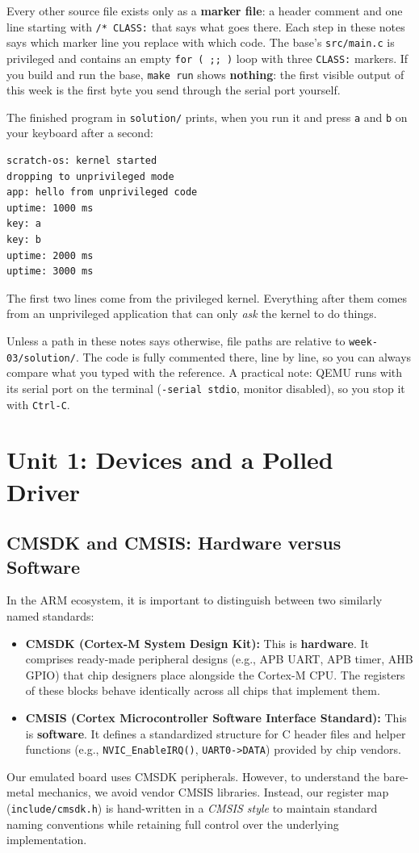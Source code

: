 Every other source file exists only as a \textbf{marker file}: a header comment and one line starting with \texttt{/* CLASS:} that says what goes there. Each step in these notes says which marker line you replace with which code. The base's \texttt{src/main.c} is privileged and contains an empty \texttt{for ( ;; )} loop with three \texttt{CLASS:} markers. If you build and run the base, \texttt{make run} shows \textbf{nothing}: the first visible output of this week is the first byte you send through the serial port yourself.

The finished program in \texttt{solution/} prints, when you run it and press \texttt{a} and \texttt{b} on your keyboard after a second:

\begin{verbatim}
scratch-os: kernel started
dropping to unprivileged mode
app: hello from unprivileged code
uptime: 1000 ms
key: a
key: b
uptime: 2000 ms
uptime: 3000 ms
\end{verbatim}

The first two lines come from the privileged kernel. Everything after them comes from an unprivileged application that can only \textit{ask} the kernel to do things.

Unless a path in these notes says otherwise, file paths are relative to \texttt{week-03/solution/}. The code is fully commented there, line by line, so you can always compare what you typed with the reference. A practical note: QEMU runs with its serial port on the terminal (\texttt{-serial stdio}, monitor disabled), so you stop it with \texttt{Ctrl-C}.

\section{Unit 1: Devices and a Polled Driver}

\subsection{CMSDK and CMSIS: Hardware versus Software}
In the ARM ecosystem, it is important to distinguish between two similarly named standards:
\begin{itemize}
    \item \textbf{CMSDK (Cortex-M System Design Kit):} This is \textbf{hardware}. It comprises ready-made peripheral designs (e.g., APB UART, APB timer, AHB GPIO) that chip designers place alongside the Cortex-M CPU. The registers of these blocks behave identically across all chips that implement them.
    \item \textbf{CMSIS (Cortex Microcontroller Software Interface Standard):} This is \textbf{software}. It defines a standardized structure for C header files and helper functions (e.g., \texttt{NVIC\_EnableIRQ()}, \texttt{UART0->DATA}) provided by chip vendors.
\end{itemize}
Our emulated board uses CMSDK peripherals. However, to understand the bare-metal mechanics, we avoid vendor CMSIS libraries. Instead, our register map (\texttt{include/cmsdk.h}) is hand-written in a \textit{CMSIS style} to maintain standard naming conventions while retaining full control over the underlying implementation.

